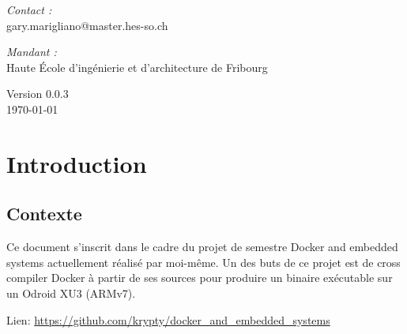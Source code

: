 \documentclass[11pt,a4paper,oneside]{report}
\newcommand{\school}{Haute École d'ingénierie et d'architecture de Fribourg }
\newcommand{\version}{0.0.3}
\begin{document}
\begin{titlepage}
\begin{center}
\vfill

\noindent
\begin{minipage}{0.4\textwidth}
  \begin{flushleft} \large
    \emph{Contact :}\\
    gary.marigliano@master.hes-so.ch
  \end{flushleft}
\end{minipage}%
\begin{minipage}{0.4\textwidth}
  \begin{flushright} \large
    \emph{Mandant :} \\
    \school
  \end{flushright}
\end{minipage}

\vfill

{\large Version \version \\ \today}

\end{center}
\end{titlepage}

\pagestyle{historystyle}
\begin{versionhistory}  
\end{versionhistory}


\tableofcontents
{}

\pagestyle{normal}

\chapter{Introduction}

\section{Contexte}\label{contexte}

Ce document s'inscrit dans le cadre du projet de semestre Docker and embedded systems actuellement réalisé par moi-même. Un des buts de ce projet est de cross compiler Docker à partir de ses sources pour produire un binaire exécutable sur un Odroid XU3 (ARMv7).

Lien: \url{https://github.com/krypty/docker_and_embedded_systems}
\end{document}
